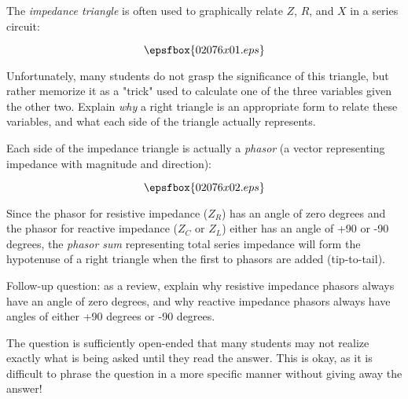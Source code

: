 

The {\it impedance triangle} is often used to graphically relate $Z$, $R$, and $X$ in a series circuit:

$$\epsfbox{02076x01.eps}$$

Unfortunately, many students do not grasp the significance of this triangle, but rather memorize it as a "trick" used to calculate one of the three variables given the other two.  Explain {\it why} a right triangle is an appropriate form to relate these variables, and what each side of the triangle actually represents.







Each side of the impedance triangle is actually a {\it phasor} (a vector representing impedance with magnitude and direction):

$$\epsfbox{02076x02.eps}$$

Since the phasor for resistive impedance ($Z_R$) has an angle of zero degrees and the phasor for reactive impedance ($Z_C$ or $Z_L$) either has an angle of +90 or -90 degrees, the {\it phasor sum} representing total series impedance will form the hypotenuse of a right triangle when the first to phasors are added (tip-to-tail).

\vskip 10pt

Follow-up question: as a review, explain why resistive impedance phasors always have an angle of zero degrees, and why reactive impedance phasors always have angles of either +90 degrees or -90 degrees.







The question is sufficiently open-ended that many students may not realize exactly what is being asked until they read the answer.  This is okay, as it is difficult to phrase the question in a more specific manner without giving away the answer!




